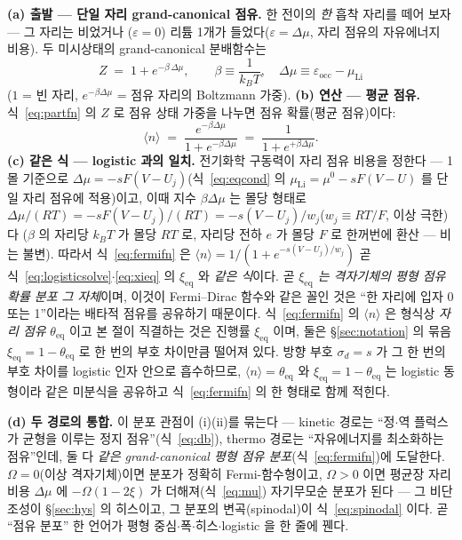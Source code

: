 \documentclass[11pt,a4paper]{article}
\newcommand{\eq}{\mathrm{eq}}
\begin{document}
\textbf{(a) 출발 — 단일 자리 grand-canonical 점유.} 한 전이의 \emph{한} 흡착 자리를 떼어 보자 — 그 자리는 비었거나
($\varepsilon=0$) 리튬 1개가 들었다($\varepsilon=\Delta\mu$, 자리 점유의 자유에너지 비용). 두 미시상태의
grand-canonical 분배함수는
\begin{equation}
Z\;=\;1+e^{-\beta\,\Delta\mu},\qquad \beta\equiv\frac{1}{k_BT},\quad
\Delta\mu\equiv\varepsilon_\mathrm{occ}-\mu_\mathrm{Li}
\label{eq:partfn}
\end{equation}
($1$ = 빈 자리, $e^{-\beta\Delta\mu}$ = 점유 자리의 Boltzmann 가중). \textbf{(b) 연산 — 평균 점유.} 식~\eqref{eq:partfn}
의 $Z$ 로 점유 상태 가중을 나누면 점유 확률(평균 점유)이다:
\begin{equation}
\langle n\rangle\;=\;\frac{e^{-\beta\Delta\mu}}{1+e^{-\beta\Delta\mu}}
\;=\;\frac{1}{1+e^{+\beta\Delta\mu}}.
\label{eq:fermifn}
\end{equation}
\textbf{(c) 같은 식 — logistic 과의 일치.} 전기화학 구동력이 자리 점유 비용을 정한다 — 1몰 기준으로
$\Delta\mu=-sF(V-U_j)$(식~\eqref{eq:eqcond} 의 $\mu_\mathrm{Li}=\mu^0-sF(V-U)$ 를 단일 자리 점유에 적용)이고, 이때
지수 $\beta\Delta\mu$ 는 몰당 형태로 $\Delta\mu/(RT)=-sF(V-U_j)/(RT)=-s(V-U_j)/w_j$($w_j\equiv RT/F$, 이상 극한)다
($\beta$ 의 자리당 $k_BT$ 가 몰당 $RT$ 로, 자리당 전하 $e$ 가 몰당 $F$ 로 한꺼번에 환산 — 비는 불변). 따라서
식~\eqref{eq:fermifn} 은 $\langle n\rangle=1/(1+e^{-s(V-U_j)/w_j})$ 곧 식~\eqref{eq:logisticsolve}$\cdot$\eqref{eq:xieq}
의 $\xi_\eq$ 와 \emph{같은 식}이다. 곧 \emph{$\xi_\eq$ 는 격자기체의 평형 점유 확률 분포 그 자체}이며, 이것이
Fermi--Dirac 함수와 같은 꼴인 것은 ``한 자리에 입자 0 또는 1''이라는 배타적 점유를 공유하기 때문이다.
식~\eqref{eq:fermifn} 의 $\langle n\rangle$ 은 형식상 \emph{자리 점유} $\theta_\eq$ 이고 본 절이 직결하는 것은 진행률
$\xi_\eq$ 이며, 둘은 \S\ref{sec:notation} 의 묶음 $\xi_\eq=1-\theta_\eq$ 로 한 번의 부호 차이만큼 떨어져 있다. 방향 부호
$\sigma_d=s$ 가 그 한 번의 부호 차이를 logistic 인자 안으로 흡수하므로, $\langle n\rangle=\theta_\eq$ 와
$\xi_\eq=1-\theta_\eq$ 는 logistic 동형이라 같은 미분식을 공유하고 식~\eqref{eq:fermifn} 의 한 형태로 함께 적힌다.

\textbf{(d) 두 경로의 통합.} 이 분포 관점이 (i)(ii)를 묶는다 — kinetic 경로는 ``정$\cdot$역 플럭스가 균형을 이루는 정지
점유''(식~\eqref{eq:db}), thermo 경로는 ``자유에너지를 최소화하는 점유''인데, 둘 다 \emph{같은 grand-canonical 평형
점유 분포}(식~\eqref{eq:fermifn})에 도달한다. $\Omega=0$(이상 격자기체)이면 분포가 정확히 Fermi-함수형이고, $\Omega>0$
이면 평균장 자리 비용 $\Delta\mu$ 에 $-\Omega(1-2\xi)$ 가 더해져(식~\eqref{eq:mu}) 자기무모순 분포가 된다 — 그
비단조성이 \S\ref{sec:hys} 의 히스이고, 그 분포의 변곡(spinodal)이 식~\eqref{eq:spinodal} 이다. 곧 ``점유 분포''
한 언어가 평형 중심$\cdot$폭$\cdot$히스$\cdot$logistic 을 한 줄에 꿴다.
\end{document}
